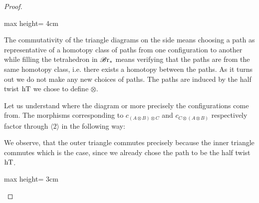 \begin{proof}
\begin{center}
\begin{adjustbox}{max height= 4cm}
        \end{adjustbox}
    \end{center}
    The commutativity of the triangle diagrams on the side means choosing a path
    as representative of a homotopy class of paths from one configuration to
    another while filling the tetrahedron in $\mathscr{B} \text{r}_{\ast}$ means verifying that the
    paths are from the same homotopy class, i.e. there exists a homotopy between
    the paths. As it turns out we do not make any new choices of paths. The
    paths are induced by the half twist $\operatorname{hT}$ we chose to define $\otimes$.

    Let us understand where the diagram or more precisely the configurations
    come from. The morphisms corresponding to $c_{(A \otimes B) \otimes C}$ and
    $c_{C \otimes (A \otimes B)}$ respectively factor through $\langle 2
    \rangle$ in the following way:
    \begin{center}
    \end{center}
    We observe, that the outer triangle commutes precisely because the inner
    triangle commutes which is the case, since we already chose the path to be
    the half twist $\operatorname{hT}$.
    \begin{center}
    \begin{adjustbox}{max height= 3cm}
\end{adjustbox}
\end{center}
\end{proof}
